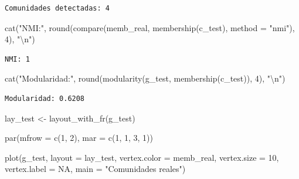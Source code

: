 \documentclass[
  letterpaper,
  DIV=11,
  numbers=noendperiod]{scrreprt}
\newenvironment{Shaded}{\begin{snugshade}}{\end{snugshade}}
\newcommand{\AttributeTok}[1]{\textcolor[rgb]{0.40,0.45,0.13}{#1}}
\newcommand{\ConstantTok}[1]{\textcolor[rgb]{0.56,0.35,0.01}{#1}}
\newcommand{\DecValTok}[1]{\textcolor[rgb]{0.68,0.00,0.00}{#1}}
\newcommand{\FunctionTok}[1]{\textcolor[rgb]{0.28,0.35,0.67}{#1}}
\newcommand{\NormalTok}[1]{\textcolor[rgb]{0.00,0.23,0.31}{#1}}
\newcommand{\OtherTok}[1]{\textcolor[rgb]{0.00,0.23,0.31}{#1}}
\newcommand{\SpecialCharTok}[1]{\textcolor[rgb]{0.37,0.37,0.37}{#1}}
\newcommand{\StringTok}[1]{\textcolor[rgb]{0.13,0.47,0.30}{#1}}
\begin{document}
\begin{tcolorbox}
\begin{verbatim}
Comunidades detectadas: 4 
\end{verbatim}

\begin{Shaded}
\begin{Highlighting}[]
\FunctionTok{cat}\NormalTok{(}\StringTok{"NMI:"}\NormalTok{, }\FunctionTok{round}\NormalTok{(}\FunctionTok{compare}\NormalTok{(memb\_real, }\FunctionTok{membership}\NormalTok{(c\_test), }\AttributeTok{method =} \StringTok{"nmi"}\NormalTok{), }\DecValTok{4}\NormalTok{), }\StringTok{"}\SpecialCharTok{\textbackslash{}n}\StringTok{"}\NormalTok{)}
\end{Highlighting}
\end{Shaded}

\begin{verbatim}
NMI: 1 
\end{verbatim}

\begin{Shaded}
\begin{Highlighting}[]
\FunctionTok{cat}\NormalTok{(}\StringTok{"Modularidad:"}\NormalTok{, }\FunctionTok{round}\NormalTok{(}\FunctionTok{modularity}\NormalTok{(g\_test, }\FunctionTok{membership}\NormalTok{(c\_test)), }\DecValTok{4}\NormalTok{), }\StringTok{"}\SpecialCharTok{\textbackslash{}n}\StringTok{"}\NormalTok{)}
\end{Highlighting}
\end{Shaded}

\begin{verbatim}
Modularidad: 0.6208 
\end{verbatim}

\begin{Shaded}
\begin{Highlighting}[]
\NormalTok{lay\_test }\OtherTok{\textless{}{-}} \FunctionTok{layout\_with\_fr}\NormalTok{(g\_test)}

\FunctionTok{par}\NormalTok{(}\AttributeTok{mfrow =} \FunctionTok{c}\NormalTok{(}\DecValTok{1}\NormalTok{, }\DecValTok{2}\NormalTok{), }\AttributeTok{mar =} \FunctionTok{c}\NormalTok{(}\DecValTok{1}\NormalTok{, }\DecValTok{1}\NormalTok{, }\DecValTok{3}\NormalTok{, }\DecValTok{1}\NormalTok{))}

\FunctionTok{plot}\NormalTok{(g\_test, }\AttributeTok{layout =}\NormalTok{ lay\_test,}
     \AttributeTok{vertex.color =}\NormalTok{ memb\_real,}
     \AttributeTok{vertex.size =} \DecValTok{10}\NormalTok{, }\AttributeTok{vertex.label =} \ConstantTok{NA}\NormalTok{,}
     \AttributeTok{main =} \StringTok{"Comunidades reales"}\NormalTok{)}


\end{Highlighting}
\end{Shaded}
\end{tcolorbox}
\end{document}
